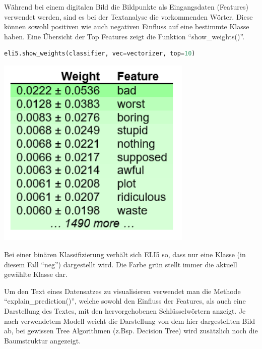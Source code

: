 \documentclass[
  12pt, %
  a4paper, %
  oneside, %
  openany, 
  numbers=noenddot, %
  BCOR=5mm, %
  parskip=half*, %
  thesis, %
]{bfhbook}
\begin{document}
Während bei einem digitalen Bild die Bildpunkte als Eingangsdaten (Features) verwendet werden, sind es bei der Textanalyse die vorkommenden Wörter. Diese können sowohl positiven wie auch negativen Einfluss auf eine bestimmte Klasse haben. Eine Übersicht der Top Features zeigt die Funktion ``show\_weights()''.
\begin{lstlisting}[language=Python]
eli5.show_weights(classifier, vec=vectorizer, top=10)
\end{lstlisting}
\begin{center}
\begin{minipage}[t]{0.45\linewidth}
\vspace{0pt}
\centering
	\includegraphics[width=0.7\textwidth]{Bilder/MovieReviews-SentimentClassification_Weights.PNG}
\end{minipage}\hfill
\begin{minipage}[t]{0.45\linewidth}
\vspace{20pt}
Bei einer binären Klassifizierung verhält sich ELI5  so, dass nur eine Klasse (in diesem Fall ``neg'') dargestellt wird. Die Farbe grün stellt immer die aktuell gewählte Klasse dar.
\end{minipage}
\end{center}

Um den Text eines Datensatzes zu visualisieren verwendet man die Methode ``explain\_prediction()'', welche sowohl den Einfluss der Features, als auch eine Darstellung des Textes, mit den hervorgehobenen Schlüsselwörtern anzeigt. Je nach verwendetem Modell weicht die Darstellung von dem hier dargestellten Bild ab, bei gewissen Tree Algorithmen (z.Bsp. Decision Tree) wird zusätzlich noch die Baumstruktur angezeigt.
\end{document}
